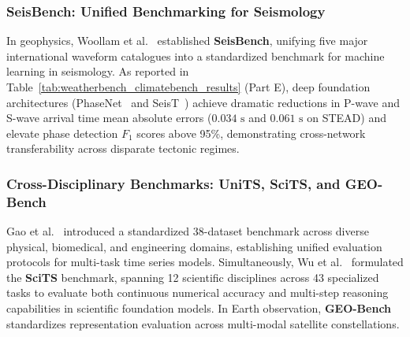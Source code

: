 \subsubsection{SeisBench: Unified Benchmarking for Seismology}
In geophysics, Woollam et al.~\cite{woollam2022seisbench} established \textbf{SeisBench}, unifying five major international waveform catalogues into a standardized benchmark for machine learning in seismology. As reported in Table~\ref{tab:weatherbench_climatebench_results} (Part E), deep foundation architectures (PhaseNet~\cite{zhu2019phasenet} and SeisT~\cite{li2024seist}) achieve dramatic reductions in P-wave and S-wave arrival time mean absolute errors ($0.034\text{ s}$ and $0.061\text{ s}$ on STEAD) and elevate phase detection $F_1$ scores above 95\%, demonstrating cross-network transferability across disparate tectonic regimes.

\subsubsection{Cross-Disciplinary Benchmarks: UniTS, SciTS, and GEO-Bench}
Gao et al.~\cite{gao2024units} introduced a standardized 38-dataset benchmark across diverse physical, biomedical, and engineering domains, establishing unified evaluation protocols for multi-task time series models. Simultaneously, Wu et al.~\cite{wu2025scits} formulated the \textbf{SciTS} benchmark, spanning 12 scientific disciplines across 43 specialized tasks to evaluate both continuous numerical accuracy and multi-step reasoning capabilities in scientific foundation models. In Earth observation, \textbf{GEO-Bench}~\cite{lacoste2023geobench} standardizes representation evaluation across multi-modal satellite constellations.

